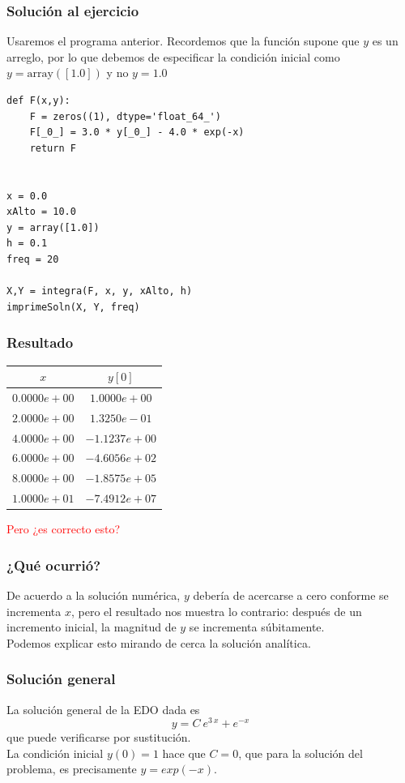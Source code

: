 \begin{frame}
\frametitle{Solución al ejercicio}
Usaremos el programa anterior. Recordemos que la función  supone que $y$ es un arreglo, por lo que debemos de especificar la condición inicial como $y = \text{array}([1.0])$ y no $y=1.0$
\end{frame}
\begin{frame}
\begin{lstlisting}[caption=Código para el ejercicio, style=FormattedNumber, basicstyle=\linespread{1.1}\ttfamily=\small, columns=fullflexible]
def F(x,y):
    F = zeros((1), dtype='float_64_')
    F[_0_] = 3.0 * y[_0_] - 4.0 * exp(-x)
    return F


x = 0.0
xAlto = 10.0
y = array([1.0])
h = 0.1
freq = 20

X,Y = integra(F, x, y, xAlto, h)
imprimeSoln(X, Y, freq)
\end{lstlisting}
\end{frame}
\begin{frame}
\frametitle{Resultado}
\begin{center}
\begin{tabular}{c | c }
$x$  &  $y[0]$ \\ \hline 
$0.0000e+00$ & $1.0000e+00$ \\ \hline
$2.0000e+00$ & $1.3250e-01$ \\ \hline
$4.0000e+00$ & $-1.1237e+00$ \\ \hline
$6.0000e+00$ & $-4.6056e+02$ \\ \hline
$8.0000e+00$ & $-1.8575e+05$ \\ \hline
$1.0000e+01$ & $-7.4912e+07$
\end{tabular}
\end{center}
\pause
\textcolor{red}{Pero ¿es correcto esto?}
\end{frame}
\begin{frame}
\frametitle{¿Qué ocurrió?}
De acuerdo a la solución numérica, $y$ debería de acercarse a cero conforme se incrementa $x$, pero el resultado nos muestra lo contrario: después de un incremento inicial, la magnitud de $y$ se incrementa súbitamente.
\\
\bigskip
Podemos explicar esto mirando de cerca la solución analítica.
\end{frame}
\begin{frame}
\frametitle{Solución general}
La solución general de la EDO dada es
\[ y = C \: e^{3\: x} + e^{-x} \]
que puede verificarse por sustitución.
\\
\medskip
La condición inicial $y(0) = 1$ hace que $C = 0$, que para la solución del problema, es precisamente $y = exp(-x)$.
\end{frame}
